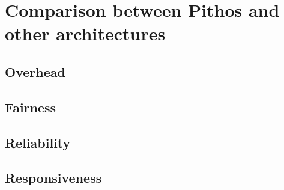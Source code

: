     \section{Comparison between Pithos and other architectures}

        \subsection{Overhead}
        \subsection{Fairness}
        \subsection{Reliability}
        \subsection{Responsiveness}
